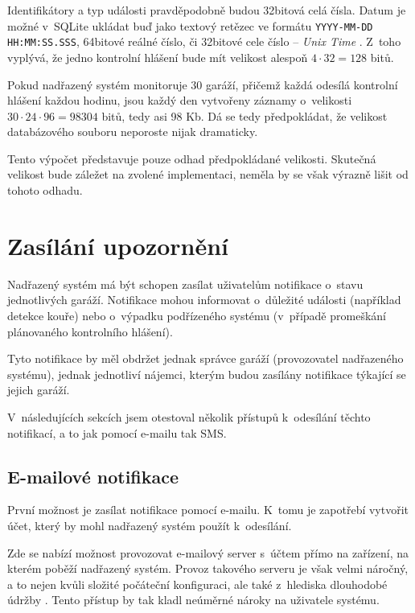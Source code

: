 Identifikátory a typ události pravděpodobně budou 32bitová celá čísla. Datum je možné v~SQLite ukládat buď jako textový retězec ve formátu \texttt{YYYY-MM-DD HH:MM:SS.SSS}, 64bitové reálné číslo, či 32bitové cele číslo -- \textit{Unix Time} \cite{sqlite_datetypes}. Z~toho vyplývá, že jedno kontrolní hlášení bude mít velikost alespoň $4 \cdot 32 = 128$ bitů.

Pokud nadřazený systém monitoruje 30 garáží, přičemž každá odesílá kontrolní hlášení každou hodinu, jsou každý den vytvořeny záznamy o~velikosti $30 \cdot 24 \cdot 96 = 98304$ bitů, tedy asi 98 Kb. Dá se tedy předpokládat, že velikost databázového souboru neporoste nijak dramaticky.

Tento výpočet představuje pouze odhad předpokládané velikosti. Skutečná velikost bude záležet na zvolené implementaci, neměla by se však výrazně lišit od tohoto odhadu.


\section{Zasílání upozornění}
\label{sec:an_notify}

Nadřazený systém má být schopen zasílat uživatelům notifikace o~stavu jednotlivých garáží. Notifikace mohou informovat o~důležité události (například detekce kouře) nebo o~výpadku podřízeného systému (v~případě promeškání plánovaného kontrolního hlášení).

Tyto notifikace by měl obdržet jednak správce garáží (provozovatel nadřazeného systému), jednak jednotliví nájemci, kterým budou zasílány notifikace týkající se jejich garáží.

V~následujících sekcích jsem otestoval několik přístupů k~odesílání těchto notifikací, a to jak pomocí e-mailu tak SMS.

\subsection{E-mailové notifikace}

První možnost je zasílat notifikace pomocí e-mailu. K~tomu je zapotřebí vytvořit účet, který by mohl nadřazený systém použít k~odesílání.

Zde se nabízí možnost provozovat e-mailový server s~účtem přímo na zařízení, na kterém poběží nadřazený systém. Provoz takového serveru je však velmi náročný, a to nejen kvůli složité počáteční konfiguraci, ale také z~hlediska dlouhodobé údržby \cite{email_dont}. Tento přístup by tak kladl neúměrné nároky na uživatele systému.

